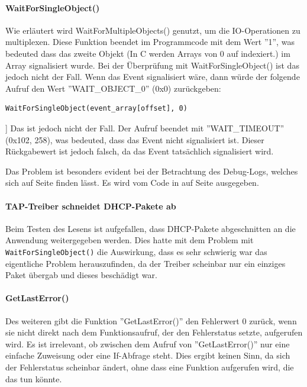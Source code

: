 \paragraph{WaitForSingleObject()}
Wie erläutert wird WaitForMultipleObjects() genutzt, um die IO-Operationen
zu multiplexen. Diese Funktion beendet im Programmcode mit dem Wert ''1'',
was bedeuted dass das zweite Objekt (In C werden Arrays von 0 auf indexiert.)
im Array signalisiert wurde. Bei der Überprüfung mit WaitForSingleObject() ist das jedoch nicht
der Fall. Wenn das Event signalisiert wäre, dann würde der folgende Aufruf
den Wert ''WAIT\_OBJECT\_0'' (0x0) zurückgeben:
\begin{lstlisting}
WaitForSingleObject(event_array[offset], 0)
\end{lstlisting}]
Das ist jedoch nicht der Fall. Der Aufruf beendet mit ''WAIT\_TIMEOUT'' (0x102, 258),
was bedeuted, dass das Event nicht signalisiert ist. Dieser Rückgabewert ist jedoch falsch,
da das Event tatsächlich signalisiert wird.

Das Problem ist besonders evident bei der Betrachtung des Debug-Logs,
welches sich auf Seite \pageref{lst:debug-log} finden lässt.
Es wird vom Code in auf Seite \pageref{lst:handle-plain-windows} ausgegeben.

\paragraph{TAP-Treiber schneidet DHCP-Pakete ab}
Beim Testen des Lesens ist aufgefallen, dass DHCP-Pakete abgeschnitten
an die Anwendung weitergegeben werden. Dies hatte mit dem Problem mit
\texttt{WaitForSingleObject()} die Auswirkung, dass es sehr schwierig war das eigentliche
Problem herauszufinden, da der Treiber scheinbar nur ein einziges Paket übergab
und dieses beschädigt war.

\paragraph{GetLastError()}
Des weiteren gibt die Funktion ''GetLastError()'' den Fehlerwert 0 zurück, wenn sie nicht
direkt nach dem Funktionsaufruf, der den Fehlerstatus setzte, aufgerufen wird.
Es ist irrelevant, ob zwischen dem Aufruf von ''GetLastError()'' nur eine einfache Zuweisung
oder eine If-Abfrage steht.
Dies ergibt keinen Sinn, da sich der Fehlerstatus scheinbar ändert, ohne dass
eine Funktion aufgerufen wird, die das tun könnte.
